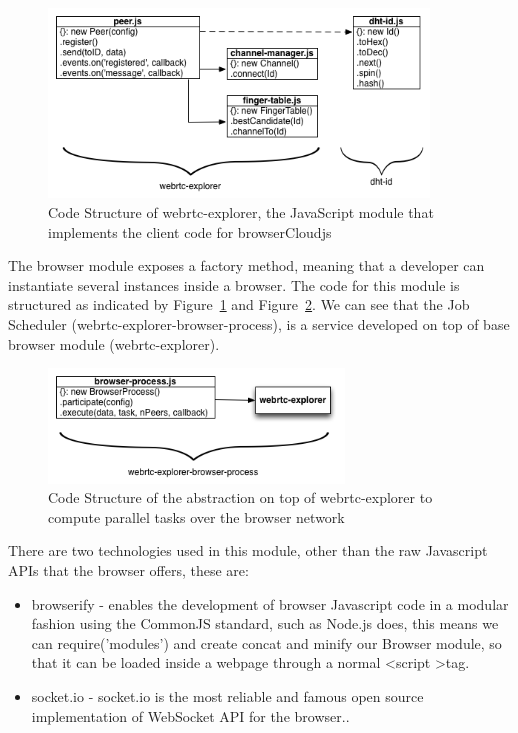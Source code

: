 \begin{figure}[h!]
  \centering
  \includegraphics[width=0.9\textwidth]{figs/diagram-webrtc-explorer}
  \caption{Code Structure of webrtc-explorer, the JavaScript module that implements the client code for browserCloudjs}
  \label{fig:d-w-e}
\end{figure}

The browser module exposes a factory method, meaning that a developer can instantiate several instances inside a browser. The code for this module is structured as indicated by Figure~\ref{fig:d-w-e} and Figure~\ref{fig:d-w-e-b-p}. We can see that the Job Scheduler (webrtc-explorer-browser-process), is a service developed on top of base browser module (webrtc-explorer).

\begin{figure}[h!]
  \centering
  \includegraphics[width=0.7\textwidth]{figs/diagram-webrtc-explorer-browser-process}
  \caption{Code Structure of the abstraction on top of webrtc-explorer to compute parallel tasks over the browser network}
  \label{fig:d-w-e-b-p}
\end{figure}

There are two technologies used in this module, other than the raw Javascript APIs that the browser offers, these are:

\begin{itemize}
    \item browserify - enables the development of browser Javascript code in a modular fashion using the CommonJS standard, such as Node.js does, this means we can require('modules') and create concat and minify our Browser module, so that it can be loaded inside a webpage through a normal \textless script \textgreater tag.
    \item socket.io - socket.io is the most reliable and famous open source implementation of WebSocket API for the browser..
\end{itemize}


